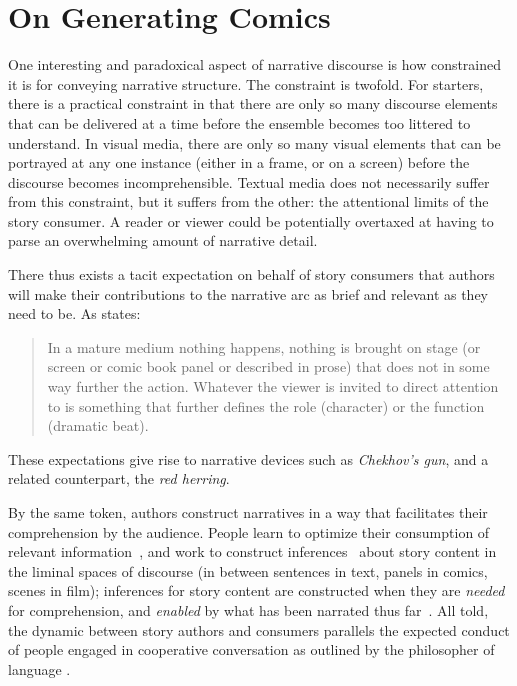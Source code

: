 \section{On Generating Comics}

One interesting and paradoxical aspect of narrative discourse is how constrained
it is for conveying narrative structure. The constraint is twofold. For
starters, there is a practical constraint in that there are only so many
discourse elements that can be delivered at a time before the ensemble becomes
too littered to understand. In visual media, there are only so many visual
elements that can be portrayed at any one instance (either in a frame, or on a
screen) before the discourse becomes incomprehensible. Textual media does not
necessarily suffer from this constraint, but it suffers from the other: the
attentional limits of the story consumer. A reader or viewer could be
potentially overtaxed at having to parse an overwhelming amount of narrative
detail.

There thus exists a tacit expectation on behalf of story consumers that authors
will make their contributions to the narrative arc as brief and relevant as they
need to be. As  states:
%
\begin{quote} In a mature medium nothing happens, nothing is brought on stage
(or screen or comic book panel or described in prose) that does not in some way
further the action. Whatever the viewer is invited to direct attention to is
something that further defines the role (character) or the function (dramatic
beat). \end{quote}
%
These expectations give rise to narrative devices such as \emph{Chekhov's gun},
and a related counterpart, the \emph{red herring}.

By the same token, authors construct narratives in a way that facilitates their
comprehension by the audience. People learn to optimize their consumption of
relevant information~\cite{pirolli2007information}, and work to construct
inferences~\cite{magliano2016filling} about story content in the liminal spaces
of discourse (in between sentences in text, panels in comics, scenes in film);
inferences for story content are constructed when they are \emph{needed} for
comprehension, and \emph{enabled} by what has been narrated thus
far~\cite{myers1987degree}. All told, the dynamic between story authors and
consumers parallels the expected conduct of people engaged in cooperative
conversation as outlined by the philosopher of language .

